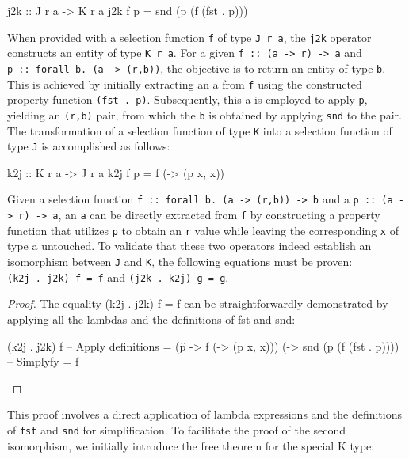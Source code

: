 \documentclass[runningheads]{llncs}
\begin{document}
\begin{code}
j2k :: J r a -> K r a
j2k f p = snd (p (f (fst . p)))
\end{code}

When provided with a selection function \texttt{f} of type
\texttt{J\ r\ a}, the \texttt{j2k} operator constructs an entity of type
\texttt{K\ r\ a}. For a given
\texttt{f\ ::\ (a\ -\textgreater{}\ r)\ -\textgreater{}\ a} and
\texttt{p\ ::\ forall\ b.\ (a\ -\textgreater{}\ (r,b))}, the objective
is to return an entity of type \texttt{b}. This is achieved by initially
extracting an a from \texttt{f} using the constructed property function
\texttt{(fst\ .\ p)}. Subsequently, this a is employed to apply
\texttt{p}, yielding an \texttt{(r,b)} pair, from which the \texttt{b}
is obtained by applying \texttt{snd} to the pair. The transformation of
a selection function of type \texttt{K} into a selection function of
type \texttt{J} is accomplished as follows:

\begin{code}
k2j :: K r a -> J r a
k2j f p = f (\x -> (p x, x)) 
\end{code}

Given a selection function
\texttt{f\ ::\ forall\ b.\ (a\ -\textgreater{}\ (r,b))\ -\textgreater{}\ b}
and a \texttt{p\ ::\ (a\ -\textgreater{}\ r)\ -\textgreater{}\ a}, an
\texttt{a} can be directly extracted from \texttt{f} by constructing a
property function that utilizes \texttt{p} to obtain an \texttt{r} value
while leaving the corresponding \texttt{x} of type a untouched. To
validate that these two operators indeed establish an isomorphism
between \texttt{J} and \texttt{K}, the following equations must be
proven: \texttt{(k2j\ .\ j2k)\ f\ =\ f} and
\texttt{(j2k\ .\ k2j)\ g\ =\ g}.

\begin{proof}
The equality (k2j . j2k) f = f can be straightforwardly demonstrated by applying all the 
lambdas and the definitions of fst and snd:
  \begin{code}
  (k2j . j2k) f
  -- {{ Apply definitions}}
  = (\f p -> f (\x -> (p x, x))) (\p -> snd (p (f (fst . p))))
  -- {{ Simplyfy }}
  = f
  \end{code}
\end{proof}

This proof involves a direct application of lambda expressions and the
definitions of \texttt{fst} and \texttt{snd} for simplification. To
facilitate the proof of the second isomorphism, we initially introduce
the free theorem for the special K type:
\end{document}
